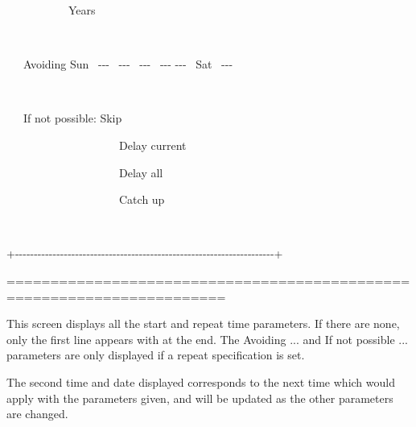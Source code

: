 \begin{exparasmall}
{\textbar} \ \ \ \ \ \ \ \ \ \ \ Years
\ \ \ \ \ \ \ \ \ \ \ \ \ \ \ \ \ \ \ \ \ \ \ \ \ \ \ \ \ \ \ \ \ \ \ \ \ \ \ \ \ \ \ \ \ \ \ \ \ \ \ {\textbar}

{\textbar}
\ \ \ \ \ \ \ \ \ \ \ \ \ \ \ \ \ \ \ \ \ \ \ \ \ \ \ \ \ \ \ \ \ \ \ \ \ \ \ \ \ \ \ \ \ \ \ \ \ \ \ \ \ \ \ \ \ \ \ \ \ \ \ \ \ \ \ \ {\textbar}

{\textbar} \ \ \ Avoiding Sun \ {}-{}-{}- \ {}-{}-{}- \ {}-{}-{}-
\ {}-{}-{}- -{}-{}- \ Sat \ {}-{}-{}-
\ \ \ \ \ \ \ \ \ \ \ \ \ \ \ \ \ \ {\textbar}

{\textbar}
\ \ \ \ \ \ \ \ \ \ \ \ \ \ \ \ \ \ \ \ \ \ \ \ \ \ \ \ \ \ \ \ \ \ \ \ \ \ \ \ \ \ \ \ \ \ \ \ \ \ \ \ \ \ \ \ \ \ \ \ \ \ \ \ \ \ \ \ {\textbar}

{\textbar} \ \ \ If not possible: Skip
\ \ \ \ \ \ \ \ \ \ \ \ \ \ \ \ \ \ \ \ \ \ \ \ \ \ \ \ \ \ \ \ \ \ \ \ \ \ \ \ \ \ {\textbar}

{\textbar} \ \ \ \ \ \ \ \ \ \ \ \ \ \ \ \ \ \ \ \ Delay current
\ \ \ \ \ \ \ \ \ \ \ \ \ \ \ \ \ \ \ \ \ \ \ \ \ \ \ \ \ \ \ \ \ \ {\textbar}

{\textbar} \ \ \ \ \ \ \ \ \ \ \ \ \ \ \ \ \ \ \ \ Delay all
\ \ \ \ \ \ \ \ \ \ \ \ \ \ \ \ \ \ \ \ \ \ \ \ \ \ \ \ \ \ \ \ \ \ \ \ \ \ {\textbar}

{\textbar} \ \ \ \ \ \ \ \ \ \ \ \ \ \ \ \ \ \ \ \ Catch up
\ \ \ \ \ \ \ \ \ \ \ \ \ \ \ \ \ \ \ \ \ \ \ \ \ \ \ \ \ \ \ \ \ \ \ \ \ \ \ {\textbar}

{\textbar}
\ \ \ \ \ \ \ \ \ \ \ \ \ \ \ \ \ \ \ \ \ \ \ \ \ \ \ \ \ \ \ \ \ \ \ \ \ \ \ \ \ \ \ \ \ \ \ \ \ \ \ \ \ \ \ \ \ \ \ \ \ \ \ \ \ \ \ \ {\textbar}

+-{}-{}-{}-{}-{}-{}-{}-{}-{}-{}-{}-{}-{}-{}-{}-{}-{}-{}-{}-{}-{}-{}-{}-{}-{}-{}-{}-{}-{}-{}-{}-{}-{}-{}-{}-{}-{}-{}-{}-{}-{}-{}-{}-{}-{}-{}-{}-{}-{}-{}-{}-{}-{}-{}-{}-{}-{}-{}-{}-{}-{}-{}-{}-{}-{}-{}-{}-{}-+

=======================================================================

\end{exparasmall}

This screen displays all the start and repeat time parameters. If there are none, only the first line appears with  at
the end. The Avoiding ... and If not possible ... parameters are only displayed if a repeat specification is set.

The second time and date displayed corresponds to the next time which would apply with the parameters given, and will be updated as the other
parameters are changed.


